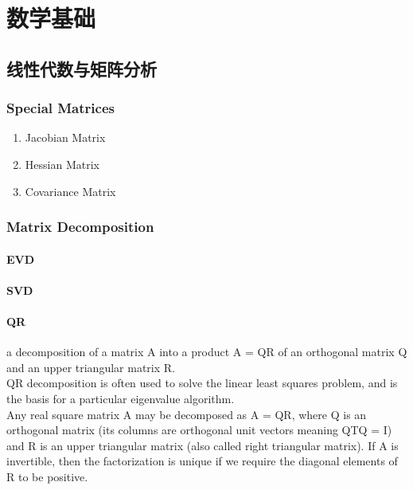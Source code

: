 \chapter{数学基础}

\section{线性代数与矩阵分析}

\subsection{Special Matrices}
\begin{enumerate}
\item Jacobian Matrix
\item Hessian Matrix
\item Covariance Matrix
\end{enumerate}

\subsection{Matrix Decomposition}

\subsubsection{EVD} 

\subsubsection{SVD} 

\subsubsection{QR} 
a decomposition of a matrix A into a product A = QR of an orthogonal matrix Q and an upper triangular matrix R.  \\

QR decomposition is often used to solve the linear least squares problem, and is the basis for a particular eigenvalue algorithm. \\

Any real square matrix A may be decomposed as A = QR, where Q is an orthogonal matrix (its columns are orthogonal unit vectors meaning QTQ = I) and R is an upper triangular matrix (also called right triangular matrix).  If A is invertible, then the factorization is unique if we require the diagonal elements of R to be positive. \\

